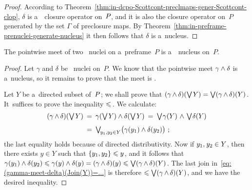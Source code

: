 \documentclass[11pt,letterpaper]{article}
\renewcommand{\thmskip}{\bigskip}
\renewcommand{\interskip}{\medskip}
\begin{document}
\interskip

\begin{proof}
According to Theorem~\ref{thm:in-dcpo-Scottcont-preclmaps-gener-Scottcont-clop},
	$\delta$ is a~\Scottcont\ closure operator on~$P\mspace{-1mu}$,
	and it is also the closure operator on~$P$ generated by the set $\Gamma$ of preclosure maps.
By Theorem~\ref{thm:in-preframe-prenuclei-generate-nucleus}
	it then follows that $\delta$ is a~nucleus.
\end{proof}

\thmskip

\begin{proposition}\label{prop:meet-of-two-Scotcont-nuclei-is-Scottcont}
The pointwise meet of two \Scottcont\ nuclei on a~preframe\/~$P$
is a~\Scottcont\ nucleus on\/~$P$.
\end{proposition}

\interskip

\begin{proof}
Let $\gamma$ and $\delta$ be \Scottcont\ nuclei on~$P$.
We know that the pointwise meet $\gamma\wedge\delta$ is a~nucleus,
so it remains to prove that the meet is \Scottcont.

Let $Y$ be a~directed subset of~$P\mspace{1mu}$;
we shall prove that
	$(\gamma\mspace{-1mu}\wedge\mspace{-1mu}\delta)(\mathop{\textstyle\bigvee}\nolimits\mspace{-1mu} Y) = \mathop{\textstyle\bigvee}\nolimits(\gamma\mspace{-1mu}\wedge\mspace{-1mu}\delta)(Y)\mspace{1mu}$.
It~suffices to prove the inequality $\leqslant\mspace{2mu}$.
We calculate:
%
\begin{equation}\label{eq:(gamma-meet-delta)(Join(Y))=...}
\begin{aligned}
(\gamma\narrt\meet\delta)(\tJoin\negtinysp Y)
    &\Eq \gamma(\tJoin\negtinysp Y) \meet \delta(\tJoin\negtinysp Y)
	\Eq \tJoin\negdtinysp\gamma(Y) \widedt\meet \tJoin\negdtinysp\delta(Y) \\[.75ex]
    &\Eq \tJoin_{\!y_1,y_2\in Y} \bigl(\gamma(y_1)\meet\delta(y_2)\bigr)~;
\end{aligned}
\end{equation}
%
the last equality holds because of directed distributivity.
Now if $y_1,\mspace{1mu} y_2\in Y$,
then there exists $y\in Y$ such that $\{ y_1,y_2 \}\leqslant y\mspace{1mu}$,
and it follows that
    $\gamma(y_1)\wedge\delta(y_2)
	\leqslant \gamma(y) \wedge \delta(y)
	= (\gamma\mspace{-1mu}\wedge\mspace{-1mu}\delta)(y)
	\leqslant \mathop{\textstyle\bigvee}\nolimits(\gamma\mspace{-1mu}\wedge\mspace{-1mu}\delta)(Y)\mspace{1mu}$.
The last join in~\eqref{eq:(gamma-meet-delta)(Join(Y))=...}
	is therefore $\leqslant\mathop{\textstyle\bigvee}\nolimits(\gamma\mspace{-1mu}\wedge\mspace{-1mu}\delta)(Y)$,
and we have the desired inequality.
\end{proof}

\thmskip
\end{document}
